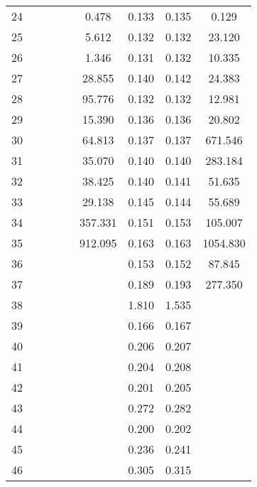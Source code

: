 \begin{table}[H]
\begin{tabular}{|l|c|c|c|c|c|c|c|c|}
          24 & & & & & 0.478 & 0.133 & 0.135 & 0.129 \\
          25 & & & & & 5.612 & 0.132 & 0.132 & 23.120 \\
          26 & & & & & 1.346 & 0.131 & 0.132 & 10.335 \\
          27 & & & & & 28.855 & 0.140 & 0.142 & 24.383 \\
          28 & & & & & 95.776 & 0.132 & 0.132 & 12.981 \\
          29 & & & & & 15.390 & 0.136 & 0.136 & 20.802 \\
          30 & & & & & 64.813 & 0.137 & 0.137 & 671.546 \\
          31 & & & & & 35.070 & 0.140 & 0.140 & 283.184 \\
          32 & & & & & 38.425 & 0.140 & 0.141 & 51.635 \\
          33 & & & & & 29.138 & 0.145 & 0.144 & 55.689 \\
          34 & & & & & 357.331 & 0.151 & 0.153 & 105.007 \\
          35 & & & & & 912.095 & 0.163 & 0.163 & 1054.830 \\
          36 & & & & & & 0.153 & 0.152 & 87.845 \\
          37 & & & & & & 0.189 & 0.193 & 277.350 \\
          38 & & & & & & 1.810 & 1.535 & \\
          39 & & & & & & 0.166 & 0.167 & \\
          40 & & & & & & 0.206 & 0.207 & \\
          41 & & & & & & 0.204 & 0.208 & \\
          42 & & & & & & 0.201 & 0.205 & \\
          43 & & & & & & 0.272 & 0.282 & \\
          44 & & & & & & 0.200 & 0.202 & \\
          45 & & & & & & 0.236 & 0.241 & \\
          46 & & & & & & 0.305 & 0.315 & \\
    \hline
  \end{tabular}
  \label{tab:exact_benchmarks}
\end{table}
